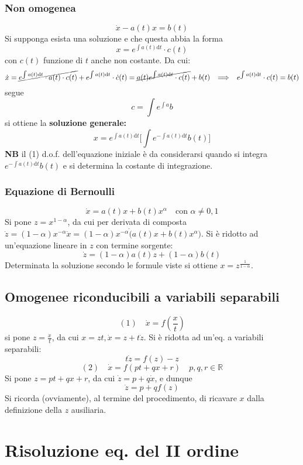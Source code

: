 \documentclass[10pt, oneside]{book}
\theoremstyle{plain}
\begin{document}
\subsubsection{Non omogenea}
\[\dot x - a(t) x = b(t)\]
Si supponga esista una soluzione e che questa abbia la forma
\[x = e^{\int a(t) \textrm{d}t} \cdot c(t)\]
con $c(t)$ funzione di $t$ anche non costante. Da cui:
\[\dot x = \cancel{e^{\int a(t) \textrm{d}t} \cdot a(t) \cdot c(t)} + e^{\int a(t) \textrm{d}t} \cdot \dot c (t) = \cancel{a(t) e^{\int a(t) \textrm{d}t} \cdot c(t)} + b(t) \enspace \implies \enspace e^{\int a(t) \textrm{d}t} \cdot c(t) = b(t)\]
segue
\[c = \int e^{\int a} b\]
si ottiene la \textbf{soluzione generale:}
\[\boxed{x = e^{\int a(t) \textrm{d}t} \big[\int e^{- \int a(t) \textrm{d}t} b(t)\big]}\]
\textbf{NB} il (1) d.o.f. dell'equazione iniziale è da considerarsi quando si integra $e^{- \int a(t) \textrm{d}t} b(t)$ e si determina la costante di integrazione.

\subsubsection{Equazione di Bernoulli}
\[\dot x = a(t) x + b(t) x^\alpha \quad \textrm{con } \alpha \neq 0,1\]
Si pone $\displaystyle z = x^{1-\alpha}$, da cui per derivata di composta $\displaystyle \dot z = (1-\alpha) x^{-\alpha}\dot x = (1-\alpha) x^{-\alpha}\dot (a(t) x + b(t) x^\alpha)$. Si è ridotto ad un'equazione lineare in $z$ con termine sorgente:
\[\dot z = (1-\alpha)a(t) z + (1-\alpha) b(t)\]
Determinata la soluzione secondo le formule viste si ottiene $x = z^{\frac{1}{1-\alpha}}$.

\subsection{Omogenee riconducibili a variabili separabili}
\[(1) \quad \dot x = f(\frac{x}{t})\]
si pone $\displaystyle z = \frac{x}{t}$, da cui $x = zt, \dot x = z + t \dot z$. Si è ridotta ad un'eq. a variabili separabili:
\[t \dot z = f(z) - z\]
\[(2) \quad \dot x = f(pt + q x + r) \quad p, q, r \in \mathbb{R}\]
Si pone $z = pt + q x + r$, da cui $\dot z = p + q \dot x$, e dunque
\[\dot z = p + q f(z)\]
Si ricorda (ovviamente), al termine del procedimento, di ricavare $x$ dalla definizione della $z$ ausiliaria.

\section{Risoluzione eq. del II ordine}
\end{document}
